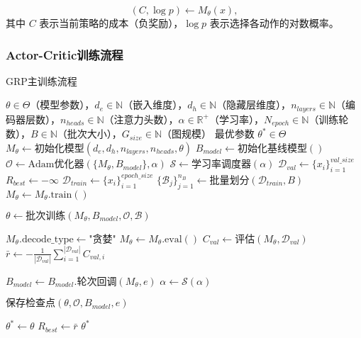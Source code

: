 \documentclass[AutoFakeBold]{LZUThesis}
\begin{document}
\begin{equation}
	(C, \log p) \leftarrow M_{\theta}(x),
\end{equation}
其中 $C$ 表示当前策略的成本（负奖励），$\log p$ 表示选择各动作的对数概率。

\subsubsection{Actor-Critic训练流程}
\begin{algorithm}[H]
	\begin{algorithmic}[1]
		\caption{GRP主训练流程}
		\label{alg:grp_main_training}
		\Require $\theta \in \Theta$（模型参数），$d_e \in \mathbb{N}$（嵌入维度），$d_h \in \mathbb{N}$（隐藏层维度），$n_{layers} \in \mathbb{N}$（编码器层数），$n_{heads} \in \mathbb{N}$（注意力头数），$\alpha \in \mathbb{R}^{+}$（学习率），$N_{epoch} \in \mathbb{N}$（训练轮数），$B \in \mathbb{N}$（批次大小），$G_{size} \in \mathbb{N}$（图规模）
		\Ensure 最优参数 $\theta^* \in \Theta$
		\State $M_{\theta} \leftarrow \text{初始化模型}(d_e, d_h, n_{layers}, n_{heads}, \theta)$
		\State $B_{model} \leftarrow \text{初始化基线模型}()$
		\State $\mathcal{O} \leftarrow \text{Adam优化器}(\{M_{\theta}, B_{model}\}, \alpha)$
		\State $\mathcal{S} \leftarrow \text{学习率调度器}(\alpha)$
		\State $\mathcal{D}_{val} \leftarrow \{x_i\}_{i=1}^{val\_size}$ 
		\State $R_{best} \leftarrow -\infty$ 
		\State $\mathcal{D}_{train} \leftarrow \{x_i\}_{i=1}^{epoch\_size}$ 
		\State $\{\mathcal{B}_j\}_{j=1}^{n_B} \leftarrow \text{批量划分}(\mathcal{D}_{train}, B)$
		\State $M_{\theta} \leftarrow M_{\theta}.\text{train}()$ 

		\State $\theta \leftarrow \text{批次训练}(M_{\theta}, B_{model}, \mathcal{O}, \mathcal{B})$ 
		\EndFor

		\State $M_{\theta}.\text{decode\_type} \leftarrow \text{"贪婪"}$
		\State $M_{\theta} \leftarrow M_{\theta}.\text{eval}()$
		\State $C_{val} \leftarrow \text{评估}(M_{\theta}, \mathcal{D}_{val})$
		\State $\bar{r} \leftarrow -\frac{1}{|\mathcal{D}_{val}|}\sum_{i=1}^{|\mathcal{D}_{val}|} C_{val,i}$ 

		\State $B_{model} \leftarrow B_{model}.\text{轮次回调}(M_{\theta}, e)$
		\State $\alpha \leftarrow \mathcal{S}(\alpha)$ 

		\State $\text{保存检查点}(\theta, \mathcal{O}, B_{model}, e)$
		\EndIf

		\State $\theta^* \leftarrow \theta$ 
		\State $R_{best} \leftarrow \bar{r}$
		\EndIf
		\EndFor
		\State \Return $\theta^*$
	\end{algorithmic}
\end{algorithm}
\end{document}
